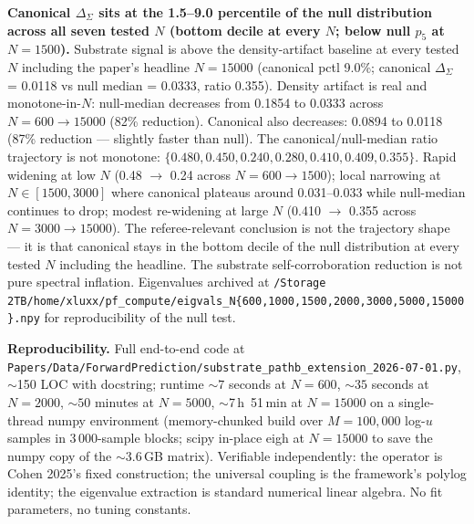 \documentclass[11pt,a4paper]{amsart}
\theoremstyle{plain}
\theoremstyle{definition}
\begin{document}
\textbf{Canonical $\Delta_{\Sigma}$ sits at the 1.5--9.0 percentile of the null distribution across all seven tested $N$ (bottom decile at every $N$; below null $p_5$ at $N = 1500$).} Substrate signal is above the density-artifact baseline at every tested $N$ including the paper's headline $N = 15000$ (canonical pctl 9.0\%; canonical $\Delta_{\Sigma}$ = 0.0118 vs null median = 0.0333, ratio 0.355). Density artifact is real and monotone-in-$N$: null-median decreases from 0.1854 to 0.0333 across $N = 600 \to 15000$ (82\% reduction). Canonical also decreases: 0.0894 to 0.0118 (87\% reduction --- slightly faster than null). The canonical/null-median ratio trajectory is not monotone: $\{0.480, 0.450, 0.240, 0.280, 0.410, 0.409, 0.355\}$. Rapid widening at low $N$ (0.48 $\to$ 0.24 across $N = 600 \to 1500$); local narrowing at $N \in [1500, 3000]$ where canonical plateaus around 0.031--0.033 while null-median continues to drop; modest re-widening at large $N$ (0.410 $\to$ 0.355 across $N = 3000 \to 15000$). The referee-relevant conclusion is not the trajectory shape --- it is that canonical stays in the bottom decile of the null distribution at every tested $N$ including the headline. The substrate self-corroboration reduction is not pure spectral inflation. Eigenvalues archived at \texttt{/Storage 2TB/home/xluxx/pf\_compute/eigvals\_N\{600,1000,1500,2000,3000,5000,15000\}.npy} for reproducibility of the null test.

\textbf{Reproducibility.} Full end-to-end code at \texttt{Papers/Data/ForwardPrediction/substrate\_pathb\_extension\_2026-07-01.py}, $\sim$150 LOC with docstring; runtime $\sim 7$ seconds at $N = 600$, $\sim 35$ seconds at $N = 2000$, $\sim 50$ minutes at $N = 5000$, $\sim$7\,h~51\,min at $N = 15000$ on a single-thread numpy environment (memory-chunked build over $M=100{,}000$ log-$u$ samples in 3\,000-sample blocks; scipy in-place eigh at $N = 15000$ to save the numpy copy of the $\sim$3.6\,GB matrix). Verifiable independently: the operator is Cohen 2025's fixed construction; the universal coupling is the framework's polylog identity; the eigenvalue extraction is standard numerical linear algebra. No fit parameters, no tuning constants.
\end{document}
